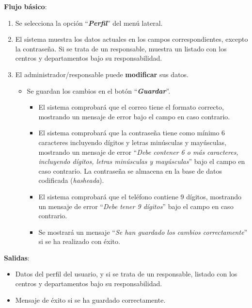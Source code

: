 \textbf{Flujo básico}:
    \begin{enumerate}
        \item Se selecciona la opción ``\textbf{\textit{Perfil}}'' del menú lateral.
        
        \item El sistema muestra los datos actuales en los campos correspondientes, excepto la contraseña. Si se trata de un responsable, muestra un listado con los centros y departamentos bajo su responsabilidad.
            
        \item El administrador/responsable puede \textbf{modificar} sus datos.
            \begin{itemize}
            \tightlist
                \item Se guardan los cambios en el botón ``\textbf{\textit{Guardar}}''. 
                    \begin{itemize}
                    \tightlist
                        \item El sistema comprobará que el correo tiene el formato correcto, mostrando un mensaje de error bajo el campo en caso contrario.
                        
                        \item El sistema comprobará que la contraseña tiene como mínimo 6 caracteres incluyendo dígitos y letras minúsculas y mayúsculas, mostrando un mensaje de error ``\textit{Debe contener 6 o más caracteres, incluyendo dígitos, letras minúsculas y mayúsculas}'' bajo el campo en caso contrario. La contraseña se almacena en la base de datos codificada (\textit{hasheada}).
                        
                        \item El sistema comprobará que el teléfono contiene 9 dígitos, mostrando un mensaje de error ``\textit{Debe tener 9 dígitos}'' bajo el campo en caso contrario.
                        
                        \item Se mostrará un mensaje ``\textit{Se han guardado los cambios correctamente}'' si se ha realizado con éxito.
                    \end{itemize}
            \end{itemize}
    \end{enumerate}

\textbf{Salidas}: 
\begin{itemize}
\tightlist
    \item Datos del perfil del usuario, y si se trata de un responsable, listado con los centros y departamentos bajo su responsabilidad.
    
    \item Mensaje de éxito si se ha guardado correctamente.
\end{itemize}

